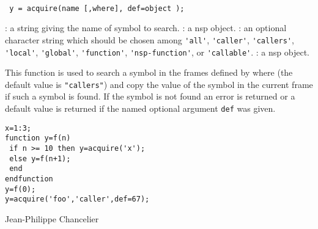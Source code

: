 
\begin{mandesc}
   \\
\end{mandesc}

\begin{calling_sequence}
\begin{verbatim}
 y = acquire(name [,where], def=object );
\end{verbatim}
\end{calling_sequence}
\begin{parameters}
  \begin{varlist}
    : a string giving the name of symbol to search.
    : a nsp object.
    : an optional character string which should be chosen 
    among \verb+'all'+, \verb+'caller'+, \verb+'callers'+, \verb+'local'+,
    \verb+'global'+, \verb+'function'+, \verb+'nsp-function'+, or 
    \verb+'callable'+.
    : a nsp object.
  \end{varlist}
\end{parameters}

\begin{mandescription}
  This function is used to search a symbol in the frames defined by where (the default value 
  is \verb+"callers"+) and copy the value of the symbol in the current frame if such a symbol is found. If the symbol is not found an error is returned or a default value is returned if 
  the named optional argument \verb+def+ was given. 
\end{mandescription}

\begin{examples}
\begin{Verbatim}
x=1:3;
function y=f(n)
 if n >= 10 then y=acquire('x'); 
 else y=f(n+1);
 end 
endfunction 
y=f(0);
y=acquire('foo','caller',def=67);
\end{Verbatim}
\end{examples}

\begin{manseealso}
\end{manseealso}

\begin{authors}
  Jean-Philippe Chancelier
\end{authors}
